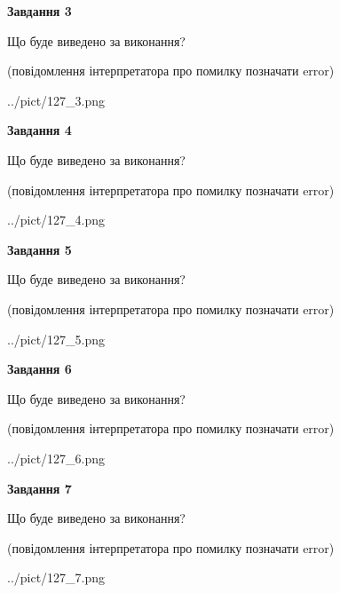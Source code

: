 \documentclass[12pt, ukrainian]{article}
\begin{document}
{\begin {large}
{\begin {center}\textbf{Завдання 3}\end {center}}\par
Що буде виведено за виконання?\par
 (повідомлення інтерпретатора про помилку позначати error)\par
\begin{center}
	{../pict/127_3.png}
\end{center}
\newpage

{\begin {center}\textbf{Завдання 4}\end {center}}\par
Що буде виведено за виконання?\par
 (повідомлення інтерпретатора про помилку позначати error)\par
\begin{center}
	{../pict/127_4.png}
\end{center}
\newpage

{\begin {center}\textbf{Завдання 5}\end {center}}\par
Що буде виведено за виконання?\par
 (повідомлення інтерпретатора про помилку позначати error)\par
\begin{center}
	{../pict/127_5.png}
\end{center}
\newpage

{\begin {center}\textbf{Завдання 6}\end {center}}\par
Що буде виведено за виконання?\par
 (повідомлення інтерпретатора про помилку позначати error)\par
\begin{center}
	{../pict/127_6.png}
\end{center}
\newpage

{\begin {center}\textbf{Завдання 7}\end {center}}\par
Що буде виведено за виконання?\par
 (повідомлення інтерпретатора про помилку позначати error)\par
\begin{center}
	{../pict/127_7.png}
\end{center}
\newpage


\end{large}}
\end{document}
